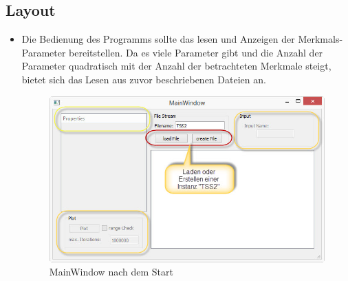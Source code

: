 \documentclass[11pt, a4paper, german]{article}
\begin{document}
	\subsection{Layout}
	\begin{itemize}
		\item Die Bedienung des Programms sollte das lesen und Anzeigen der Merkmals-Parameter bereitstellen. Da es viele Parameter gibt und die Anzahl der Parameter quadratisch mit der Anzahl der betrachteten Merkmale steigt, bietet sich das Lesen aus zuvor beschriebenen Dateien an.
		\begin{figure}[H]
			\centering
			\includegraphics[width=0.7\linewidth]{./Pictures/MainWindow_Start}
			\caption[Startwindow]{MainWindow nach dem Start}
			\label{MainWindow_Start}
		\end{figure}


\end{itemize}
\end{document}

